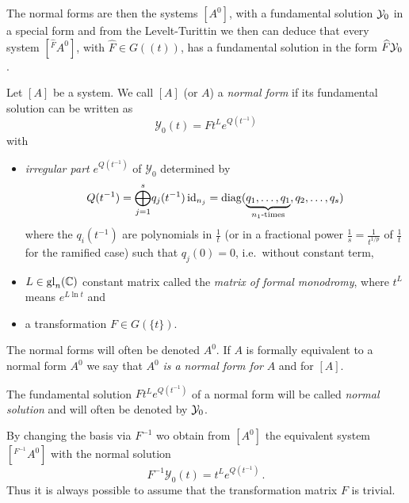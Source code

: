 The normal forms are then the systems $[A^0]$, with a fundamental solution
$\mathcal{Y}_0$ in a special form and from the Levelt-Turittin we then can deduce that
every system $[{}^{\hat F}\!A^0]$, with $\hat F\in G(\!(t)\!)$, has a
fundamental solution in the form $\widehat F\mathcal{Y}_0$.
\begin{defn}\label{defn:normSol}
  Let $[A]$ be a system.
  We call $[A]$ (or $A$) a \emph{normal form} if its fundamental solution can
  be written as
  \[
    \mathcal{Y}_0(t)=F t^L e^{Q(t^{-1})}
  \]
  with
  \begin{itemize}
    \item \emph{irregular part} $e^{Q(t^{-1})}$ of $\mathcal{Y}_0$ determined
      by
      \[
        Q(t^{-1})=\underset{j=1}{\overset{s}{\bigoplus}}q_j(t^{-1})\id_{n_j}
          =\diag(\underset{n_1\text{-times}}{\underbrace{%
          q_1,\dots,q_1}},q_2,\dots,q_s)
      \]
      where the $q_i(t^{-1})$ are polynomials in $\frac{1}{t}$ (or in a
      fractional power $\frac{1}{s}=\frac{1}{t^{1/p}}$ of $\frac{1}{t}$ for the
      ramified case) such that $q_j(0)=0$, i.e.\ without constant term,
    \item $L\in\operatorname{gl}_n(\mathbb{C})$ constant
      matrix called the \emph{matrix of formal
      monodromy}, where $t^L$ means $e^{L\ln t}$ and
    \item a transformation $F\in G(\!\{t\}\!)$.
  \end{itemize}
  The normal forms will often be denoted $A^0$.
  If $A$ is formally equivalent to a normal form $A^0$ we say that $A^0$
  \emph{is a normal form for} $A$ and for $[A]$.

  The fundamental solution $F t^L e^{Q(t^{-1})}$ of a normal form will be
  called \emph{normal solution} and will often be denoted by $\mathcal{Y}_0$.
  \begin{s-rem}
     By changing the basis
    via $F^{-1}$ wo obtain from $[A^0]$ the equivalent system
    $[{}^{F^{-1}}\!A^0]$ with the normal solution
    \[
      F^{-1}\mathcal{Y}_0(t)=t^L e^{Q(t^{-1})} \,.
    \]
    Thus it is always possible to assume that the transformation matrix $F$ is
    trivial.
  \end{s-rem}
  \begin{comment}
    \begin{s-rem}
      The system $[A^0]$ has the same monodromy as $t^L$. \comm{In fact, every
      formally equivalent system has the same monodromy.}
    \end{s-rem}
  \end{comment}
\end{defn}
